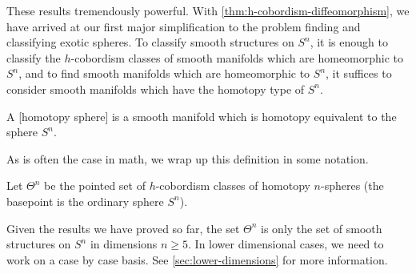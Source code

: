 These results tremendously powerful. With \cref{thm:h-cobordism-diffeomorphism}, we have arrived at our first major simplification to the problem finding and classifying exotic spheres. To classify smooth structures on $S^n$, it is enough to classify the $h$-cobordism classes of smooth manifolds which are homeomorphic to $S^n$, and to find smooth manifolds which are homeomorphic to $S^n$, it suffices to consider smooth manifolds which have the homotopy type of $S^n$.

\begin{definition}
	A [homotopy sphere] is a smooth manifold which is homotopy equivalent to the sphere $S^n$.
\end{definition}

As is often the case in math, we wrap up this definition in some notation.

\begin{definition}
	Let $\Theta^n$ be the pointed set of $h$-cobordism classes of homotopy $n$-spheres (the basepoint is the ordinary sphere $S^n$).
\end{definition}

\begin{remark}
	Given the results we have proved so far, the set $\Theta^n$ is only the set of smooth structures on $S^n$ in dimensions $n\geq 5$. In lower dimensional cases, we need to work on a case by case basis. See \cref{sec:lower-dimensions} for more information.
\end{remark}


